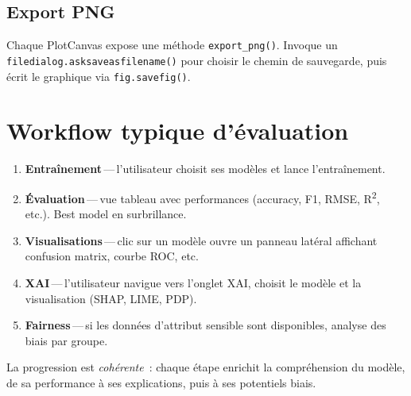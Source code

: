 \documentclass[11pt,a4paper]{report}
\begin{document}
\subsection{Export PNG}

Chaque PlotCanvas expose une m\'ethode \texttt{export\_png()}.
Invoque un \texttt{filedialog.asksaveasfilename()} pour choisir le
chemin de sauvegarde, puis \'ecrit le graphique via
\texttt{fig.savefig()}.

\section{Workflow typique d'\'evaluation}

\begin{enumerate}
    \item \textbf{Entra\^inement}\,---\,l'utilisateur choisit ses mod\`eles et lance
        l'entra\^inement.
    \item \textbf{\'Evaluation}\,---\,vue tableau avec performances (accuracy, F1,
        RMSE, R\textsuperscript{2}, etc.). Best model en surbrillance.
    \item \textbf{Visualisations}\,---\,clic sur un mod\`ele ouvre un panneau
        lat\'eral affichant confusion matrix, courbe ROC, etc.
    \item \textbf{XAI}\,---\,l'utilisateur navigue vers l'onglet XAI, choisit
        le mod\`ele et la visualisation (SHAP, LIME, PDP).
    \item \textbf{Fairness}\,---\,si les donn\'ees d'attribut sensible sont
        disponibles, analyse des biais par groupe.
\end{enumerate}

La progression est \textit{coh\'erente}~: chaque \'etape enrichit la
compr\'ehension du mod\`ele, de sa performance \`a ses explications, puis
\`a ses potentiels biais.
\end{document}
